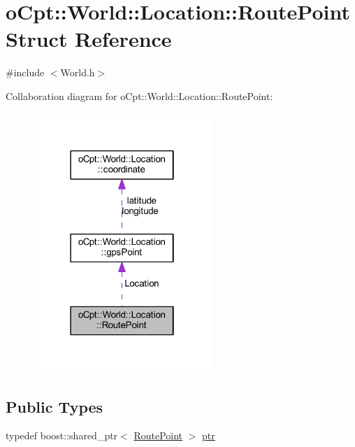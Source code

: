 \hypertarget{structo_cpt_1_1_world_1_1_location_1_1_route_point}{}\section{o\+Cpt\+:\+:World\+:\+:Location\+:\+:Route\+Point Struct Reference}
\label{structo_cpt_1_1_world_1_1_location_1_1_route_point}


{\ttfamily \#include $<$World.\+h$>$}



Collaboration diagram for o\+Cpt\+:\+:World\+:\+:Location\+:\+:Route\+Point\+:\nopagebreak
\begin{figure}[H]
\begin{center}
\leavevmode
\includegraphics[width=190pt]{structo_cpt_1_1_world_1_1_location_1_1_route_point__coll__graph}
\end{center}
\end{figure}
\subsection*{Public Types}
\begin{DoxyCompactItemize}
\item 
typedef boost\+::shared\+\_\+ptr$<$ \hyperlink{structo_cpt_1_1_world_1_1_location_1_1_route_point}{Route\+Point} $>$ \hyperlink{structo_cpt_1_1_world_1_1_location_1_1_route_point_aa042feea77cb3c1531ab4e8ecf42fbd6}{ptr}
\end{DoxyCompactItemize}
